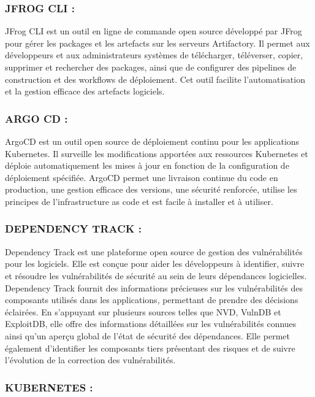 \subsubsection{JFROG CLI :}

JFrog CLI est un outil en ligne de commande open source développé par JFrog pour gérer les packages et les artefacts sur les serveurs Artifactory. Il permet aux développeurs et aux administrateurs systèmes de télécharger, téléverser, copier, supprimer et rechercher des packages, ainsi que de configurer des pipelines de construction et des workflows de déploiement. Cet outil facilite l’automatisation et la gestion efficace des artefacts logiciels.
\subsubsection{ARGO CD :}

ArgoCD est un outil open source de déploiement continu pour les applications Kubernetes. Il surveille les modifications apportées aux ressources Kubernetes et déploie automatiquement les mises à jour en fonction de la configuration de déploiement spécifiée. ArgoCD permet une livraison continue du code en production, une gestion efficace des versions, une sécurité renforcée, utilise les principes de l’infrastructure as code et est facile à installer et à utiliser.

\subsubsection{DEPENDENCY TRACK :}

Dependency Track est une plateforme open source de gestion des vulnérabilités pour les logiciels. Elle est conçue pour aider les développeurs à identifier, suivre et résoudre les vulnérabilités de sécurité au sein de leurs dépendances logicielles. Dependency Track fournit des informations précieuses sur les vulnérabilités des composants utilisés dans les applications, permettant de prendre des décisions éclairées. En s’appuyant sur plusieurs sources telles que NVD, VulnDB et ExploitDB, elle offre des informations détaillées sur les vulnérabilités connues ainsi qu’un aperçu global de l’état de sécurité des dépendances. Elle permet également d’identifier les composants tiers présentant des risques et de suivre l’évolution de la correction des vulnérabilités.

\subsubsection{KUBERNETES :}

